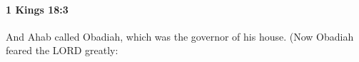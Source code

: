 
		\paragraph{1 Kings 18:3} %
			\label{1KINGS-18-3}

			And Ahab called Obadiah, which was the governor of his house. (Now Obadiah feared the LORD greatly:


